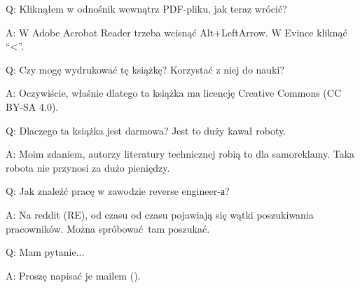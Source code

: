 \par Q: Kliknąłem w odnośnik wewnątrz PDF-pliku, jak teraz wrócić?
\par A: W Adobe Acrobat Reader trzeba wcisnąć Alt+LeftArrow. W Evince kliknąć ``<''.

\par Q: Czy mogę wydrukować tę książkę? Korzystać z niej do nauki?
\par A: Oczywiście, właśnie dlatego ta książka ma licencję Creative Commons (CC BY-SA 4.0).

\par Q: Dlaczego ta książka jest darmowa? Jest to duży kawał roboty.
\par A: Moim zdaniem, autorzy literatury technicznej robią to dla samoreklamy. Taka robota nie przynosi za dużo pieniędzy.

\par Q: Jak znaleźć pracę w zawodzie reverse engineer-а?
\par A: Na reddit (RE\FNURLREDDIT), od czasu od czasu pojawiają się wątki poszukiwania pracowników.
Można spróbować tam poszukać.


\par Q: Mam pytanie...
\par A: Proszę napisać je mailem (\EMAIL).


